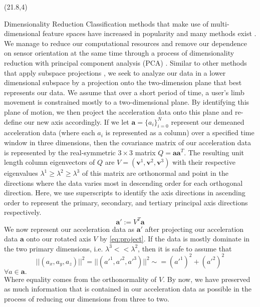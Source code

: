 \documentclass[unknownkeysallowed,final]{beamer}
\begin{document}
\begin{frame}{}
\begin{textblock}{18}(21.8,4)

\begin{block}{\small{Dimensionality Reduction}}
Classification methods that make use of multi-dimensional feature spaces have increased in popularity and many methods exist \cite{survey_multi_view_machine_learning}.
We manage to reduce our computational resources and remove our dependence on sensor orientation at the same time through a process of dimensionality reduction with principal component analysis (PCA) \cite{bishop_2006}.
Similar to other methods that apply subspace projections \cite{low_rank_subspace}, we seek to analyze our data in a lower dimensional subspace by a projection onto the two-dimension plane that best represents our data.
We assume that over a short period of time, a user's limb movement is constrained mostly to a two-dimensional plane.
By identifying this plane of motion, we then project the acceleration data onto this plane and re-define our new axis accordingly.
%
If we let $\textbf{a} = \{a_i\}_{i=0}^{N}$ represent our demeaned acceleration data (where each $a_i$ is represented as a column) over a specified time window in three dimensions, then the covariance matrix of our acceleration data is represented by the real-symmetric $3 \times 3$ matrix $Q = \textbf{a} \textbf{a}^T$.
The resulting unit length column eigenvectors of $Q$ are $V = (\textbf{v}^1,\textbf{v}^2,\textbf{v}^3)$ with their respective eigenvalues $\lambda^1 \geq \lambda^2 \geq \lambda^3$ of this matrix are orthonormal and point in the directions where the data varies most in descending order for each orthogonal direction.
Here, we use superscripts to identify the axis directions in ascending order to represent the primary, secondary, and tertiary principal axis directions respectively.
%
\begin{equation} \label{eq:project}
   \textbf{a}' := V^T \textbf{a}
\end{equation}
%
We now represent our acceleration data as $\textbf{a}'$ after projecting our acceleration data $\textbf{a}$ onto our rotated axis $V$ by \eqref{eq:project}. If the data is mostly dominate in the two primary dimensions, i.e. $\lambda^3 << \lambda^2$, then it is safe to assume that
%
\begin{equation} \label{eq:magnitude}
||(a_x,a_y,a_z)||^2 = ||(a'^1,a'^2,a'^3)||^2 \sim = (a'^1)^2 + (a'^2)^2
\end{equation}
$ \forall a \in \textbf{a}. $ \\
%
Where equality comes from the orthonormality of $V$.
By now, we have preserved as much information that is contained in our acceleration data as possible in the process of reducing our dimensions from three to two.


\end{block}
\end{textblock}
\end{frame}
\end{document}

